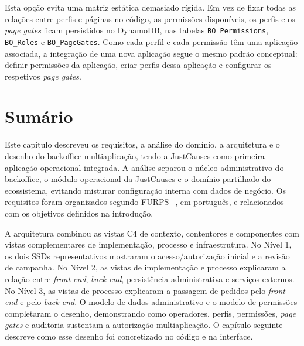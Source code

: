 Esta opção evita uma matriz estática demasiado rígida. Em vez de fixar todas as relações entre perfis e páginas no código, as permissões disponíveis, os perfis e os \textit{page gates} ficam persistidos no DynamoDB, nas tabelas \texttt{BO\_Permissions}, \texttt{BO\_Roles} e \texttt{BO\_PageGates}. Como cada perfil e cada permissão têm uma aplicação associada, a integração de uma nova aplicação segue o mesmo padrão conceptual: definir permissões da aplicação, criar perfis dessa aplicação e configurar os respetivos \textit{page gates}.


\section{Sumário}
\label{sec:sumario_cap3}

Este capítulo descreveu os requisitos, a análise do domínio, a arquitetura e o desenho do backoffice multiaplicação, tendo a JustCauses como primeira aplicação operacional integrada. A análise separou o núcleo administrativo do backoffice, o módulo operacional da JustCauses e o domínio partilhado do ecossistema, evitando misturar configuração interna com dados de negócio. Os requisitos foram organizados segundo \gls{FURPS+}, em português, e relacionados com os objetivos definidos na introdução.

A arquitetura combinou as vistas C4 de contexto, contentores e componentes com vistas complementares de implementação, processo e infraestrutura. No Nível 1, os dois \glspl{SSD} representativos mostraram o acesso/autorização inicial e a revisão de campanha. No Nível 2, as vistas de implementação e processo explicaram a relação entre \textit{front-end}, \textit{back-end}, persistência administrativa e serviços externos. No Nível 3, as vistas de processo explicaram a passagem de pedidos pelo \textit{front-end} e pelo \textit{back-end}. O modelo de dados administrativo e o modelo de permissões completaram o desenho, demonstrando como operadores, perfis, permissões, \textit{page gates} e auditoria sustentam a autorização multiaplicação. O capítulo seguinte descreve como esse desenho foi concretizado no código e na interface.
